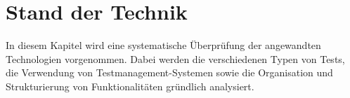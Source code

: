 \chapter{Stand der Technik}

In diesem Kapitel wird eine systematische Überprüfung der angewandten Technologien vorgenommen. Dabei werden die verschiedenen Typen von Tests, die Verwendung von Testmanagement-Systemen sowie die Organisation und Strukturierung von Funktionalitäten gründlich analysiert.








\newpage